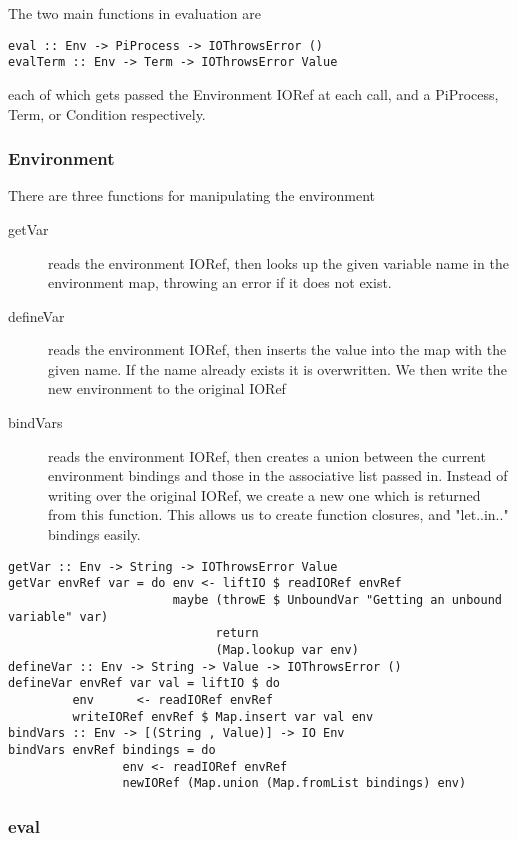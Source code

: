 The two main functions in evaluation are

\begin{verbatim}
eval :: Env -> PiProcess -> IOThrowsError () 
evalTerm :: Env -> Term -> IOThrowsError Value
\end{verbatim}

each of which gets passed the Environment IORef at each call, and a PiProcess, Term, or Condition respectively.

\subsubsection{Environment}

There are three functions for manipulating the environment
\begin{description}
    \item[getVar] reads the environment IORef, then looks up the given variable name in the environment map, throwing an error if it does not exist.
    \item[defineVar] reads the environment IORef, then inserts the value into the map with the given name. If the name already exists it is overwritten. We then write the new environment to the original IORef
    \item[bindVars] reads the environment IORef, then creates a union between the current environment bindings and those in the associative list passed in. Instead of writing over the original IORef, we create a new one which is returned from this function. This allows us to create function closures, and "let..in.." bindings easily.
\end{description}
\begin{verbatim}
getVar :: Env -> String -> IOThrowsError Value 
getVar envRef var = do env <- liftIO $ readIORef envRef
                       maybe (throwE $ UnboundVar "Getting an unbound variable" var)
                             return
                             (Map.lookup var env)
defineVar :: Env -> String -> Value -> IOThrowsError ()
defineVar envRef var val = liftIO $ do
         env      <- readIORef envRef
         writeIORef envRef $ Map.insert var val env
bindVars :: Env -> [(String , Value)] -> IO Env
bindVars envRef bindings = do
                env <- readIORef envRef
                newIORef (Map.union (Map.fromList bindings) env)
\end{verbatim}


\subsubsection{eval}

